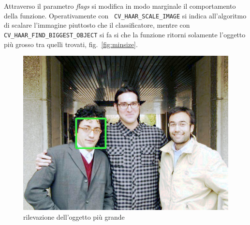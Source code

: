 \documentclass[a4paper,11pt]{article}
\begin{document}
Attraverso il parametro \emph{flags} si modifica in modo marginale il
comportamento della funzione. Operativamente con \texttt{\small
  CV\_HAAR\_SCALE\_IMAGE} si indica all'algoritmo di scalare
l'immagine piuttosto che il classificatore, mentre con \\
\texttt{\small CV\_HAAR\_FIND\_BIGGEST\_OBJECT} si fa si che la
funzione ritorni solamente l'oggetto più grosso tra quelli trovati,
fig.~\ref{fig:minsize}.

\begin{figure}[htbp]
  \centering
  \includegraphics[scale=0.28]{../code/big}
  \caption{rilevazione dell'oggetto più grande}
  \label{fig:big}
\end{figure}



\end{document}

